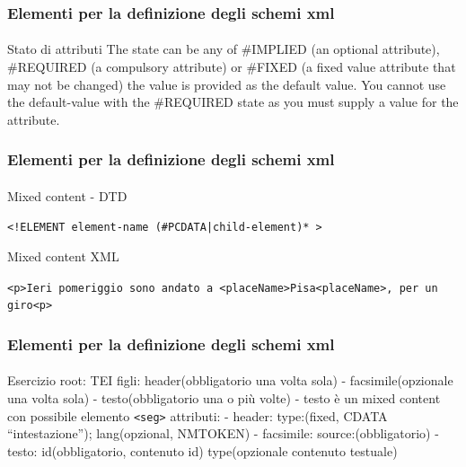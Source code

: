 \begin{frame}
    \frametitle{Elementi per la definizione degli schemi xml}
    \framesubtitle{}
    \addtocounter{nframe}{1}

    \begin{block}{Stato di attributi}
     The state can be any of \#IMPLIED (an optional attribute), \#REQUIRED (a compulsory attribute) or \#FIXED (a fixed value attribute that may not be changed) the value is provided as the default value. You cannot use the default-value with the \#REQUIRED state as you must supply a value for the attribute.
    \end{block}
\end{frame}


\begin{frame}
    \frametitle{Elementi per la definizione degli schemi xml}
    \framesubtitle{}
    \addtocounter{nframe}{1}

    \begin{block}{Mixed content - DTD}
    \begin{center}\texttt{<!ELEMENT element-name (\#PCDATA|child-element)* >}\end{center}
    \end{block}

    \begin{block}{Mixed content XML}
    \begin{center}\texttt{<p>Ieri pomeriggio sono andato a <placeName>Pisa<placeName>, per un giro<p>}\end{center}
    \end{block}

\end{frame}


\begin{frame}
    \frametitle{Elementi per la definizione degli schemi xml}
    \framesubtitle{}
    \addtocounter{nframe}{1}

    \begin{block}{Esercizio}
        root: TEI
         figli: header(obbligatorio una volta sola) - facsimile(opzionale una volta sola) - testo(obbligatorio una o più volte)
         - testo è un mixed content con possibile elemento \texttt{<seg>} attributi: 
         - header: type:(fixed, CDATA ``intestazione''); lang(opzional, NMTOKEN)
         - facsimile: source:(obbligatorio)
         - testo: id(obbligatorio, contenuto id) type(opzionale contenuto testuale)
    \end{block}
\end{frame}


